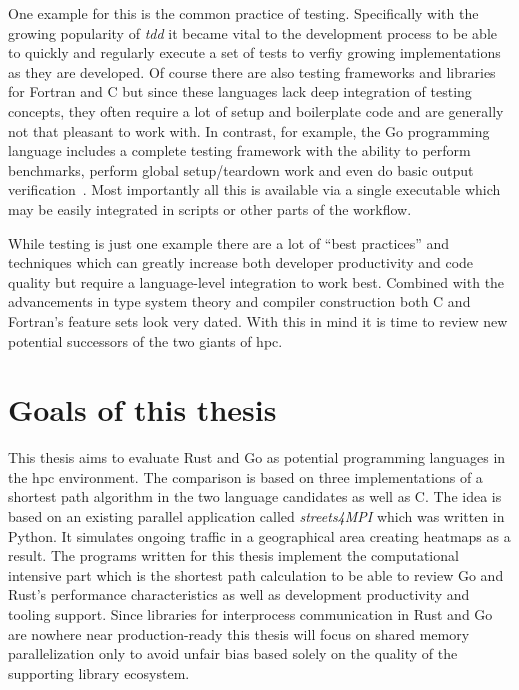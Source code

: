 One example for this is the common practice of testing. Specifically with the growing popularity of \textit{\gls{tdd}} it became vital to the development process to be able to quickly and regularly execute a set of tests to verfiy growing implementations as they are developed. Of course there are also testing frameworks and libraries for Fortran and C but since these languages lack deep integration of testing concepts, they often require a lot of setup and boilerplate code and are generally not that pleasant to work with. In contrast, for example, the Go programming language includes a complete testing framework with the ability to perform benchmarks, perform global setup/teardown work and even do basic output verification~\cite{go_doc_testing}. Most importantly all this is available via a single executable  which may be easily integrated in scripts or other parts of the workflow.

While testing is just one example there are a lot of ``best practices'' and techniques which can greatly increase both developer productivity and code quality but require a language-level integration to work best. Combined with the advancements in type system theory and compiler construction both C and Fortran's feature sets look very dated. With this in mind it is time to review new potential successors of the two giants of \gls{hpc}.

\section{Goals of this thesis}
\label{sec:Introduction::Goals}

This thesis aims to evaluate Rust and Go as potential programming languages in the \gls{hpc} environment. The comparison is based on three implementations of a shortest path algorithm in the two language candidates as well as C. The idea is based on an existing parallel application called \textit{streets4MPI} which was written in Python. It simulates ongoing traffic in a geographical area creating heatmaps as a result. The programs written for this thesis implement the computational intensive part which is the shortest path calculation to be able to review Go and Rust's performance characteristics as well as development productivity and tooling support. Since libraries for interprocess communication in Rust and Go are nowhere near production-ready this thesis will focus on shared memory parallelization only to avoid unfair bias based solely on the quality of the supporting library ecosystem.

